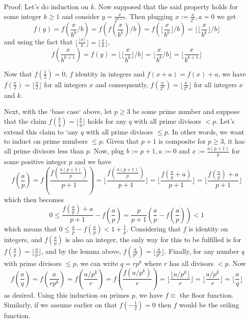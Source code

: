 \documentclass[11pt,a4paper]{article}
\begin{document}
\begin{enumerate}
		Proof: Let's do induction on $k$.  Now supposed that the said property holds for some integer $k\ge 1$ and consider $y=\frac{x}{2^{k+1}}$. Then plugging $x:=\frac{x}{2^k}, a=0$ we get
		\[
		f(y)=f(\frac{x}{b^k}/b)=f(f(\frac{x}{b^k})/b)=f(\lfloor\frac{x}{b^k}\rfloor/b)=\lfloor\lfloor\frac{x}{b^k}\rfloor/b\rfloor
		\]
		and using the fact that $\lfloor \frac{\lfloor x\rfloor}{b}\rfloor=\lfloor \frac{x}{b}\rfloor$, 
		\[
		f(\frac{x}{b^{k+1}})=f(y)=\lfloor\lfloor\frac{x}{b^k}\rfloor/b\rfloor=\lfloor\frac{x}{b^k}/b\rfloor
		=\lfloor\frac{x}{b^{k+1}}\rfloor
		\]
		
		Now that $f(\frac 12)=0$, $f$ identity in integers and $f(x+a)=f(x)+a$, we have $f(\frac{x}{2})=\lfloor \frac x2\rfloor$ for all integers $x$ and consequently, $f(\frac{x}{2^k})=\lfloor \frac x{2^k}\rfloor$ for all integers $x$ and $k$. 
		
		Next, with the `base case` above, let $p\ge 3$ be some prime number and suppose that the claim $f(\frac{b}{q})=\lfloor \frac{b}{q}\rfloor$ holds for any $q$ with all prime divisors $<p$. Let's extend this claim to `any $q$ with all prime divisors $\le p$. In other words, we want to induct on prime numbers $\le p$. Given that $p+1$ is composite for $p\ge 3$, it has all prime divisors less than $p$. Now, plug $b:=p + 1, a:=0$ and $x:= \frac{a(p+1)}{p}$ for some positive integer $p$ and we have 
		\[
		f(\frac{a}{p})=f(\frac{f(\frac{a(p+1)}{p})}{p+1})=\lfloor \frac{f(\frac{a(p+1)}{p})}{p+1}\rfloor
		= \lfloor \frac{f(\frac{a}{p}+a)}{p+1}\rfloor
		=\lfloor \frac{f(\frac{a}{p})+a}{p+1}\rfloor
		\]
		which then becomes 
		\[0\le \frac{f(\frac{a}{p})+a}{p+1} - f(\frac{a}{p})= \frac{p}{p+1}(\frac{a}{p}-f(\frac{a}{p}))< 1
		\]
		which means that $0\le \frac{a}{p}-f(\frac{a}{p})< 1+ \frac{1}{p}$. Considering that $f$ is identity on integers, and $f(\frac{a}{p})$ is also an integer, the only way for this to be fulfilled is for $f(\frac{a}{p})=\lfloor \frac{a}{p}\rfloor$, and by the lemma above, $f(\frac{a}{p^k})=\lfloor \frac{a}{p^k}\rfloor$. 
		Finally, for any number $q$ with prime divisors $\le p$, we can write $q=rp^k$ where $r$ has all divisors $<p$. Now 
		\[
		f(\frac{a}{q})
		=f(\frac{a}{rp^k})
		=f(\frac{a/p^k}{r})
		=f(\frac{f(a/p^k)}{r})
		=\lfloor\frac{\lfloor a/p^k\rfloor}{r}\rfloor
		=\lfloor\frac{a/p^k}{r}\rfloor
		=\lfloor\frac{a}{q}\rfloor
		\]
		as desired. Using this induction on primes $p$, we have $f\equiv $ the floor function. Similarly, if we assume earlier on that $f(-\frac 12)=0$ then $f$ would be the ceiling function. 
	 
\end{enumerate}
\end{document}

